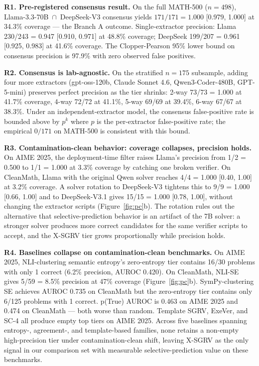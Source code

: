 \documentclass{article}
\begin{document}
\textbf{R1. Pre-registered consensus result.} On the full MATH-500 ($n{=}498$), Llama-3.3-70B~$\cap$~DeepSeek-V3 consensus yields $171/171 = 1.000$ [0.979, 1.000] at 34.3\% coverage --- the Branch A outcome. Single-extractor precision: Llama 230/243 = 0.947 [0.910, 0.971] at 48.8\% coverage; DeepSeek 199/207 = 0.961 [0.925, 0.983] at 41.6\% coverage. The Clopper-Pearson 95\% lower bound on consensus precision is 97.9\% with zero observed false positives.

\textbf{R2. Consensus is lab-agnostic.} On the stratified $n{=}175$ subsample, adding four more extractors (gpt-oss-120b, Claude Sonnet 4.6, Qwen3-Coder-480B, GPT-5-mini) preserves perfect precision as the tier shrinks: 2-way 73/73 = 1.000 at 41.7\% coverage, 4-way 72/72 at 41.1\%, 5-way 69/69 at 39.4\%, 6-way 67/67 at 38.3\%. Under an independent-extractor model, the consensus false-positive rate is bounded above by $p^k$ where $p$ is the per-extractor false-positive rate; the empirical $0/171$ on MATH-500 is consistent with this bound.

\textbf{R3. Contamination-clean behavior: coverage collapses, precision holds.} On AIME 2025, the deployment-time filter raises Llama's precision from 1/2 = 0.500 to 1/1 = 1.000 at 3.3\% coverage by catching one broken verifier. On CleanMath, Llama with the original Qwen solver reaches 4/4 = 1.000 [0.40, 1.00] at 3.2\% coverage. A solver rotation to DeepSeek-V3 tightens this to 9/9 = 1.000 [0.66, 1.00] and to DeepSeek-V3.1 gives 15/15 = 1.000 [0.78, 1.00], without changing the extractor scripts (Figure~\ref{fig:pc}b). The rotation rules out the alternative that selective-prediction behavior is an artifact of the 7B solver: a stronger solver produces more correct candidates for the same verifier scripts to accept, and the X-SGRV tier grows proportionally while precision holds.

\textbf{R4. Baselines collapse on contamination-clean benchmarks.} On AIME 2025, NLI-clustering semantic entropy's zero-entropy tier contains 16/30 problems with only 1 correct (6.2\% precision, AUROC 0.420). On CleanMath, NLI-SE gives 5/59 = 8.5\% precision at 47\% coverage (Figure~\ref{fig:pc}b). SymPy-clustering SE achieves AUROC 0.735 on CleanMath but the zero-entropy tier contains only 6/125 problems with 1 correct. p(True) AUROC is 0.463 on AIME 2025 and 0.474 on CleanMath --- both worse than random. Template SGRV, ExeVer, and SC-4 all produce empty top tiers on AIME 2025. Across five baselines spanning entropy-, agreement-, and template-based families, none retains a non-empty high-precision tier under contamination-clean shift, leaving X-SGRV as the only signal in our comparison set with measurable selective-prediction value on these benchmarks.
\end{document}
